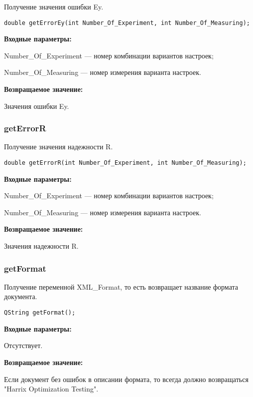 \documentclass[a4paper,12pt]{article}
\begin{document}
Получение значения ошибки Ey.


\begin{lstlisting}[label=code_syntax_getErrorEy,caption=Синтаксис]
double getErrorEy(int Number_Of_Experiment, int Number_Of_Measuring);
\end{lstlisting}

\textbf{Входные параметры:}

Number\_Of\_Experiment --- номер комбинации вариантов настроек;
 
    Number\_Of\_Measuring --- номер измерения варианта настроек.

\textbf{Возвращаемое значение:}

Значения ошибки Ey.


\subsubsection{getErrorR}\label{getErrorR}

Получение значения надежности R.


\begin{lstlisting}[label=code_syntax_getErrorR,caption=Синтаксис]
double getErrorR(int Number_Of_Experiment, int Number_Of_Measuring);
\end{lstlisting}

\textbf{Входные параметры:}

Number\_Of\_Experiment --- номер комбинации вариантов настроек;
 
    Number\_Of\_Measuring --- номер измерения варианта настроек.

\textbf{Возвращаемое значение:}

Значения надежности R.


\subsubsection{getFormat}\label{getFormat}

Получение переменной XML\_Format, то есть возвращает название формата документа.


\begin{lstlisting}[label=code_syntax_getFormat,caption=Синтаксис]
QString getFormat();
\end{lstlisting}

\textbf{Входные параметры:}

Отсутствует.

\textbf{Возвращаемое значение:}

Если документ без ошибок в описании формата, то всегда должно возвращаться "Harrix Optimization Testing".
\end{document}
